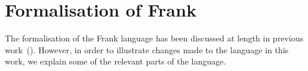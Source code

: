 \documentclass[msc,deptreport,cs]{infthesis} %
\makeatletter
\newcommand\figscale{0.85}
\newcommand{\many}{\overline}
\newcommand\ba{\begin{array}}
\newcommand\ea{\end{array}}
\newenvironment{syn}{\ba{@{}l@{~}r@{~}c@{~}l@{}}}{\ea}
\newcommand{\adj}{\Delta}
\newcommand{\sigs}{\Sigma}
\newcommand{\thunk}[1]{\{{#1}\}}
\newcommand\slab[1]{(\textrm{#1})}
\newcommand{\effin}[1]{\langle {#1} \rangle}
\newcommand{\effout}[1]{[{#1}]}
\newcommand{\gor}{\mid}
\makeatother
\begin{document}
\chapter{Formalisation of Frank}
\label{chap:formalisation}

The formalisation of the Frank language has been discussed at length in previous
work~(\cite{convent2020doo}). However, in order to illustrate changes made to
the language in this work, we explain some of the relevant parts of the
language.

\begin{figure}[h]  %
\scalebox{\figscale}{%
\[
\ba{@{}c@{}}
\ba{@{}c@{\quad\quad}c@{}}
\begin{syn}
  \slab{data types}            & D \\
  \slab{value type variables}  & X \\
  \slab{effect type variables} & E \\
  \slab{value types}           & A, B   &::= & D~\overline{R} \\
                               &        &\gor& \thunk{C} \gor X \\
  \slab{computation types}     & C      &::= & \many{T \to}~G \\
  \slab{argument types}        & T      &::= & \effin{\adj}A \\
  \slab{return types}          & G      &::= & \effout{\sigs}A \\


\end{syn}\]}
\end{figure}
\end{document}
